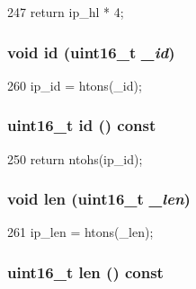 \begin{DoxyCode}
247 { return ip_hl * 4; }
\end{DoxyCode}
\hypertarget{structNet_1_1IpHdr_a9db8dfe86557c01909531924c64daddb}{
\subsubsection[{id}]{\setlength{\rightskip}{0pt plus 5cm}void id (uint16\_\-t {\em \_\-id})}}
\label{structNet_1_1IpHdr_a9db8dfe86557c01909531924c64daddb}



\begin{DoxyCode}
260 { ip_id = htons(_id); }
\end{DoxyCode}
\hypertarget{structNet_1_1IpHdr_ad7a497f547f07fe4ac682194ed947640}{
\subsubsection[{id}]{\setlength{\rightskip}{0pt plus 5cm}uint16\_\-t id () const}}
\label{structNet_1_1IpHdr_ad7a497f547f07fe4ac682194ed947640}



\begin{DoxyCode}
250 { return ntohs(ip_id); }
\end{DoxyCode}
\hypertarget{structNet_1_1IpHdr_a6d227a891dced5a88df38f29d545e8aa}{
\subsubsection[{len}]{\setlength{\rightskip}{0pt plus 5cm}void len (uint16\_\-t {\em \_\-len})}}
\label{structNet_1_1IpHdr_a6d227a891dced5a88df38f29d545e8aa}



\begin{DoxyCode}
261 { ip_len = htons(_len); }
\end{DoxyCode}
\hypertarget{structNet_1_1IpHdr_aca537e1680645b058d622981e2fb1c13}{
\subsubsection[{len}]{\setlength{\rightskip}{0pt plus 5cm}uint16\_\-t len () const}}
\label{structNet_1_1IpHdr_aca537e1680645b058d622981e2fb1c13}



